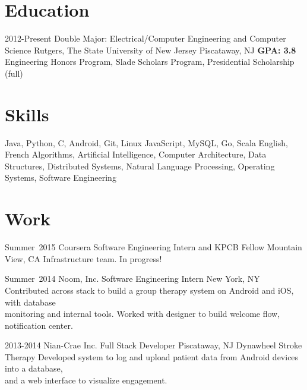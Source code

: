 \documentclass[11pt,letterpaper]{moderncv}
\begin{document}
\maketitle

\section{Education}
\cventry
    {2012-Present}
    {Double Major: Electrical/Computer Engineering and Computer Science}
    {\break Rutgers, The State University of New Jersey}
    {Piscataway, NJ}
    {\textbf{GPA: 3.8}}
    {Engineering Honors Program, Slade Scholars Program, Presidential Scholarship (full)}

\section{Skills}
       {Java, Python, C, Android, Git, Linux}
       {JavaScript, MySQL, Go, Scala}
       {English, French}
       {Algorithms, Artificial Intelligence, Computer Architecture, Data Structures, Distributed Systems, Natural Language Processing, Operating Systems, Software Engineering}

\section{Work}
    \cventry
        {Summer~2015}
        {Coursera}
        {Software Engineering Intern and KPCB Fellow}
        {Mountain View, CA}
        {}
        {Infrastructure team. In progress! \\}

    \cventry
        {Summer~2014}
        {Noom, Inc.}
        {Software Engineering Intern}
        {New York, NY}
        {}
        {Contributed across stack to build a group therapy system on Android and iOS, with database\\monitoring and internal tools. Worked with designer to build welcome flow, notification center.\\}

    \cventry
        {2013-2014}
        {Nian-Crae Inc.}
        {Full Stack Developer}
        {Piscataway, NJ}
        {Dynawheel Stroke Therapy}
        {Developed system to log and upload patient data from Android devices into a database,\\and a web interface to visualize engagement.\\}
\end{document}
